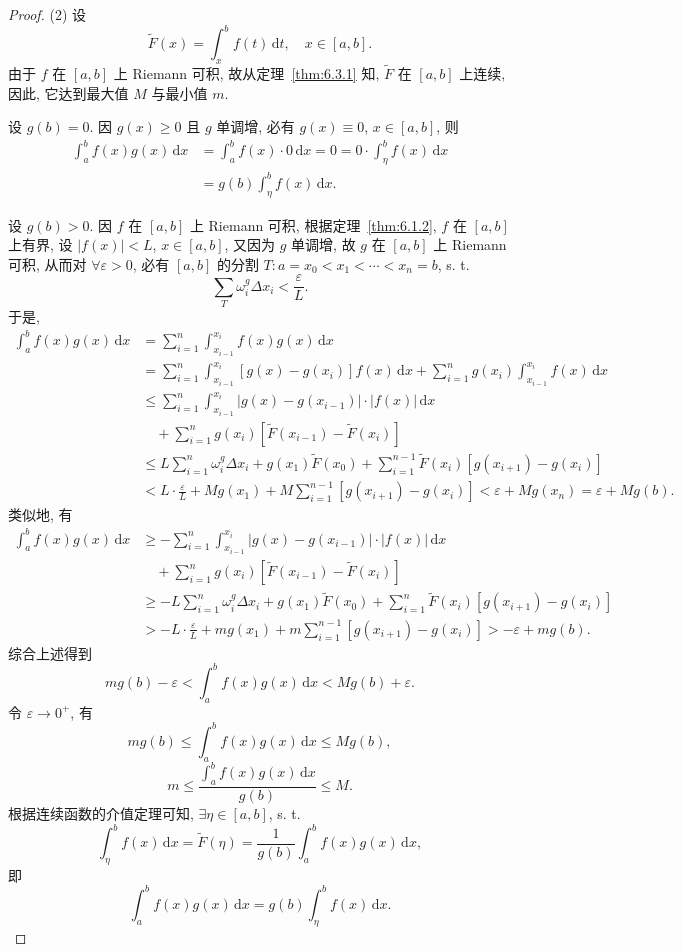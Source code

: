 \begin{proof}
(2) 设
\[
\widetilde{F}(x)=\int_{x}^{b}f(t)\,\mathrm{d}t,\quad x\in[a,b].
\]
由于 $f$ 在 $[a,b]$ 上 Riemann 可积, 故从定理~\ref{thm:6.3.1} 知, $\widetilde{F}$ 在 $[a,b]$ 上连续, 因此, 它达到最大值 $M$ 与最小值 $m$.

设 $g(b)=0$. 因 $g(x)\geqslant 0$ 且 $g$ 单调增, 必有 $g(x)\equiv 0$, $x\in[a,b]$, 则
\begin{align*}
\int_{a}^{b}f(x)g(x)\,\mathrm{d}x&=\int_{a}^{b}f(x)\cdot 0\,\mathrm{d}x=0=0\cdot\int_{\eta}^{b}f(x)\,\mathrm{d}x\\
&=g(b)\int_{\eta}^{b}f(x)\,\mathrm{d}x.
\end{align*}

设 $g(b)>0$. 因 $f$ 在 $[a,b]$ 上 Riemann 可积, 根据定理~\ref{thm:6.1.2}, $f$ 在 $[a,b]$ 上有界, 设 $|f(x)|<L$, $x\in[a,b]$, 又因为 $g$ 单调增, 故 $g$ 在 $[a,b]$ 上 Riemann 可积, 从而对 $\forall\varepsilon>0$, 必有 $[a,b]$ 的分割 $T:a=x_{0}<x_{1}<\cdots<x_{n}=b$, s. t.
\[
\sum_{T}\omega_{i}^{g}\Delta x_{i}<\frac{\varepsilon}{L}.
\]
于是,
\begin{align*}
\int_{a}^{b}f(x)g(x)\,\mathrm{d}x&=\sum_{i=1}^{n}\int_{x_{i-1}}^{x_{i}}f(x)g(x)\,\mathrm{d}x\\
&=\sum_{i=1}^{n}\int_{x_{i-1}}^{x_{i}}[g(x)-g(x_{i})]f(x)\,\mathrm{d}x+\sum_{i=1}^{n}g(x_{i})\int_{x_{i-1}}^{x_{i}}f(x)\,\mathrm{d}x\\
&\leqslant\sum_{i=1}^{n}\int_{x_{i-1}}^{x_{i}}|g(x)-g(x_{i-1})|\cdot|f(x)|\,\mathrm{d}x\\
&\quad+\sum_{i=1}^{n}g(x_{i})[\widetilde{F}(x_{i-1})-\widetilde{F}(x_{i})]\\
&\leqslant L\sum_{i=1}^{n}\omega_{i}^{g}\Delta x_{i}+g(x_{1})\widetilde{F}(x_{0})+\sum_{i=1}^{n-1}\widetilde{F}(x_{i})[g(x_{i+1})-g(x_{i})]\\
&<L\cdot\frac{\varepsilon}{L}+Mg(x_{1})+M\sum_{i=1}^{n-1}[g(x_{i+1})-g(x_{i})]<\varepsilon+Mg(x_{n})=\varepsilon+Mg(b).
\end{align*}
类似地, 有
\begin{align*}
\int_{a}^{b}f(x)g(x)\,\mathrm{d}x&\geqslant-\sum_{i=1}^{n}\int_{x_{i-1}}^{x_{i}}|g(x)-g(x_{i-1})|\cdot|f(x)|\,\mathrm{d}x\\
&\quad+\sum_{i=1}^{n}g(x_{i})[\widetilde{F}(x_{i-1})-\widetilde{F}(x_{i})]\\
&\geqslant-L\sum_{i=1}^{n}\omega_{i}^{g}\Delta x_{i}+g(x_{1})\widetilde{F}(x_{0})+\sum_{i=1}^{n}\widetilde{F}(x_{i})[g(x_{i+1})-g(x_{i})]\\
&>-L\cdot\frac{\varepsilon}{L}+mg(x_{1})+m\sum_{i=1}^{n-1}[g(x_{i+1})-g(x_{i})]>-\varepsilon+mg(b).
\end{align*}
综合上述得到
\[
mg(b)-\varepsilon<\int_{a}^{b}f(x)g(x)\,\mathrm{d}x<Mg(b)+\varepsilon.
\]
令 $\varepsilon\to 0^{+}$, 有
\[
mg(b)\leqslant\int_{a}^{b}f(x)g(x)\,\mathrm{d}x\leqslant Mg(b),
\]
\[
m\leqslant\frac{\displaystyle\int_{a}^{b}f(x)g(x)\,\mathrm{d}x}{g(b)}\leqslant M.
\]
根据连续函数的介值定理可知, $\exists\eta\in[a,b]$, s. t.
\[
\int_{\eta}^{b}f(x)\,\mathrm{d}x=\widetilde{F}(\eta)=\frac{1}{g(b)}\int_{a}^{b}f(x)g(x)\,\mathrm{d}x,
\]
即
\[
\int_{a}^{b}f(x)g(x)\,\mathrm{d}x=g(b)\int_{\eta}^{b}f(x)\,\mathrm{d}x.
\]
\end{proof}

